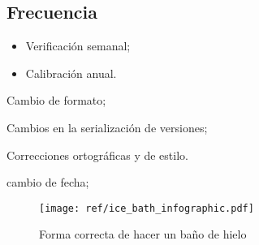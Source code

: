 \subsection{Frecuencia}

\begin{itemize}
	\item Verificación semanal;
	\item Calibración anual.
\end{itemize}

\begin{changelog}[title=Registro de cambios,simple, sectioncmd=\subsection*,label=changelog-\thesection-\MayorVer.\MenorVer]
	\begin{version}[v=\MayorVer.\MenorVer, date=2023--01, author=Pablo E. Alanis]
		\item Cambio de formato;
		\item Cambios en la serialización de versiones;
		\item Correcciones ortográficas y de estilo.
	\end{version}

	\begin{version}[v=1.7, date=2022--05, author=Alonso M.]
		\item cambio de fecha;
	\end{version}

\end{changelog}


\begin{figure}[p]
    \centering
    \texttt{[image: ref/ice\_bath\_infographic.pdf]}
    \caption[Forma correcta de hacer un baño de hielo]{Forma correcta de hacer un baño de hielo}
    \label{fig:IceBath}
\end{figure}
